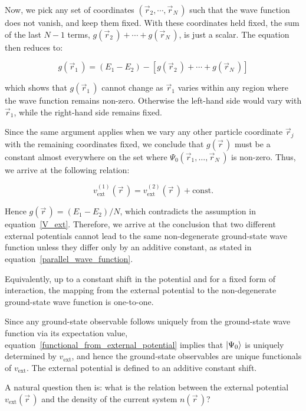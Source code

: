 Now, we pick any set of coordinates $(\vec{r}_2,\cdots,\vec{r}_N\,)$ such that the wave function does not vanish, and keep them fixed.
With these coordinates held fixed, the sum of the last $N-1$ terms,
$g(\vec{r}_2\,)+\cdots+g(\vec{r}_N\,)$, is just a scalar.
The equation then reduces to:

\begin{equation}
    g(\vec{r}_1\,)= (E_1-E_2)-\left[g(\vec{r}_2\,)+\cdots+g(\vec{r}_N\,)\right]
\label{fixed_N-body_shift_potential}
\end{equation}

which shows that $g(\vec{r}_1\,)$ cannot change as $\vec{r}_1$ varies within any region where the wave function remains non-zero.
Otherwise the left-hand side would vary with $\vec{r}_1$, while the right-hand side remains fixed.

Since the same argument applies when we vary any other particle coordinate $\vec{r}_j$ with the remaining coordinates fixed,
we conclude that $g(\vec{r}\,)$ must be a constant almost everywhere on the set where $\Psi_0(\vec{r}_1,\ldots,\vec{r}_N\,)$ is non-zero.
Thus, we arrive at the following relation:

\begin{equation}
    v_\mathrm{ext}^{(1)}(\vec{r}\,)=v_\mathrm{ext}^{(2)}(\vec{r}\,)+\mathrm{const.}
\label{parallel_wave_function}
\end{equation}

Hence $g(\vec{r}\,)=(E_1-E_2)/N$, which contradicts the assumption in equation~\eqref{V_ext}.
Therefore, we arrive at the conclusion that two different external potentials cannot lead to the same non-degenerate ground-state wave function unless they differ only by an additive constant, as stated in equation~\eqref{parallel_wave_function}.

Equivalently, up to a constant shift in the potential and for a fixed form of interaction, the mapping from the external potential to the non-degenerate ground-state wave function is one-to-one.

Since any ground-state observable follows uniquely from the ground-state wave function via its expectation value, equation~\eqref{functional_from_external_potential} implies that $\ket{\Psi_0}$ is uniquely determined by $v_\mathrm{ext}$, and hence the ground-state observables are unique functionals of $v_\mathrm{ext}$.
The external potential is defined to an additive constant shift.

A natural question then is: what is the relation between the external potential $v_\mathrm{ext}(\vec{r}\,)$ and the density of the current system $n(\vec{r}\,)$?

